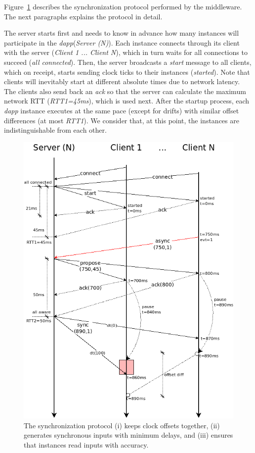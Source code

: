 \documentclass[sigplan,screen]{acmart}
\newcommand{\dapp}{\emph{dapp}\xspace}
\begin{document}
Figure~\ref{fig.protocol} describes the synchronization protocol performed by
the middleware.
The next paragraphs explains the protocol in detail.

The server starts first and needs to know in advance how many instances will
participate in the \dapp (\emph{Server (N)}).
Each instance connects through its client with the server
(\emph{Client 1 ... Client N}), which in turn waits for all connections to
succeed (\emph{all connected}).
Then, the server broadcasts a \emph{start} message to all clients, which on
receipt, starts sending clock ticks to their instances (\emph{started}).
Note that clients will inevitably start at different absolute times due to
network latency.
The clients also send back an \emph{ack} so that the server can calculate the
maximum network RTT (\emph{RTT1=45ms}), which is used next.
%
After the startup process, each \dapp instance executes at the same pace
(except for drifts) with similar offset differences (at most \emph{RTT1}).
We consider that, at this point, the instances are indistinguishable from each
other.

\begin{figure}[t]
  \centering
  \includegraphics[width=\linewidth]{protocol}
  \caption{
    \label{fig.protocol}
    The synchronization protocol
        (i) keeps clock offsets together,
        (ii) generates synchronous inputs with minimum delays, and
        (iii) ensures that instances read inputs with accuracy.
  }
\end{figure}
\end{document}
